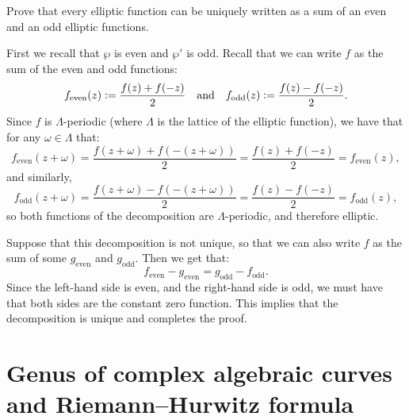\documentclass[11pt, a4paper]{article}
\begin{document}
\begin{exercise}
  Prove that every elliptic function can be uniquely written
  as a sum of an even and an odd elliptic functions.
\end{exercise}
\begin{solution}
  First we recall that $\wp$ is even and $\wp'$ is odd.
  Recall that we can write $f$ as the sum of the even and odd
  functions:
  \[
    f_{\text{even}}(z) := \frac{f(z) + f(-z)}{2} \quad \text{and} \quad
    f_{\text{odd}}(z) := \frac{f(z) - f(-z)}{2}.
  \]
  Since $f$ is $\Lambda$-periodic (where $\Lambda$ is the lattice of the
  elliptic function), we have that for any $\omega \in \Lambda$ that:
  \[
    f_{\text{even}}(z+\omega) =
    \frac{f(z+\omega) + f(-(z+\omega))}{2} =
    \frac{f(z) + f(-z)}{2} =
    f_{\text{even}}(z),
  \]
  and similarly,
  \[
    f_{\text{odd}}(z+\omega) =
    \frac{f(z+\omega) - f(-(z+\omega))}{2} =
    \frac{f(z) - f(-z)}{2} =
    f_{\text{odd}}(z),
  \]
  so both functions of the decomposition are $\Lambda$-periodic,
  and therefore elliptic.

  Suppose that this decomposition is not unique,
  so that we can also write $f$ as the sum of some $g_{\text{even}}$
  and $g_{\text{odd}}$.
  Then we get that:
  \[
    f_{\text{even}} - g_{\text{even}} =
    g_{\text{odd}} - f_{\text{odd}}.
  \]
  Since the left-hand side is even, and the right-hand side is odd,
  we must have that both sides are the constant zero function.
  This implies that the decomposition is unique and completes the proof.
\end{solution}


\newpage

\section{Genus of complex algebraic curves and Riemann--Hurwitz formula}
\end{document}
